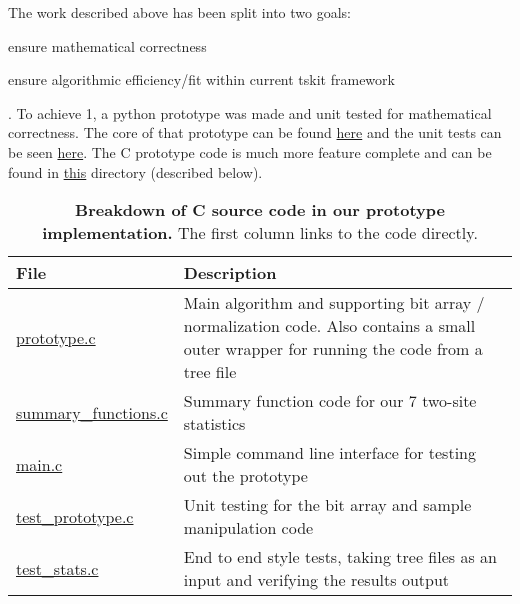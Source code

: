 \documentclass[12pt]{article}
\begin{document}
The work described above has been split into two goals:
\begin{enumerate*}
\item ensure mathematical correctness
\item ensure algorithmic efficiency/fit within current tskit framework
\end{enumerate*}.
To achieve 1, a python prototype was made and unit tested for mathematical
correctness. The core of that prototype can be found
\href{https://github.com/lkirk/ts-two-locus-proto/blob/main/two_locus_proto/site.py}{here}
and the unit tests can be seen
\href{https://github.com/lkirk/ts-two-locus-proto/blob/main/test/test_ld_proto.py}{here}.
The C prototype code is much more feature complete and can be found in
\href{https://github.com/lkirk/ts-two-locus-proto/tree/main/c}{this} directory
(described below).

\newlength\q
\setlength{}

\begin{table}[H]
  \begin{tabular}{ lp{\q} }
    File & Description \\
    \hline
\href{https://github.com/lkirk/ts-two-locus-proto/blob/main/c/prototype.c}{prototype.c}
& Main algorithm and supporting bit array / normalization code. Also contains a
small outer wrapper for running the code from a tree file \\
\href{https://github.com/lkirk/ts-two-locus-proto/blob/main/c/summary_functions.c}{summary\_functions.c}
& Summary function code for our 7 two-site statistics \\
\href{https://github.com/lkirk/ts-two-locus-proto/blob/main/c/main.c}{main.c} &
Simple command line interface for testing out the prototype \\
\href{https://github.com/lkirk/ts-two-locus-proto/blob/main/c/test_prototype.c}{test\_prototype.c}
& Unit testing for the bit array and sample manipulation code \\
\href{https://github.com/lkirk/ts-two-locus-proto/blob/main/c/test_stats.c}{test\_stats.c}
& End to end style tests, taking tree files as an input and verifying the
results output \\
  \end{tabular}
  \caption{
    \textbf{Breakdown of C source code in our prototype implementation.}
    The first column links to the code directly.
  }
\end{table}




\end{document}

